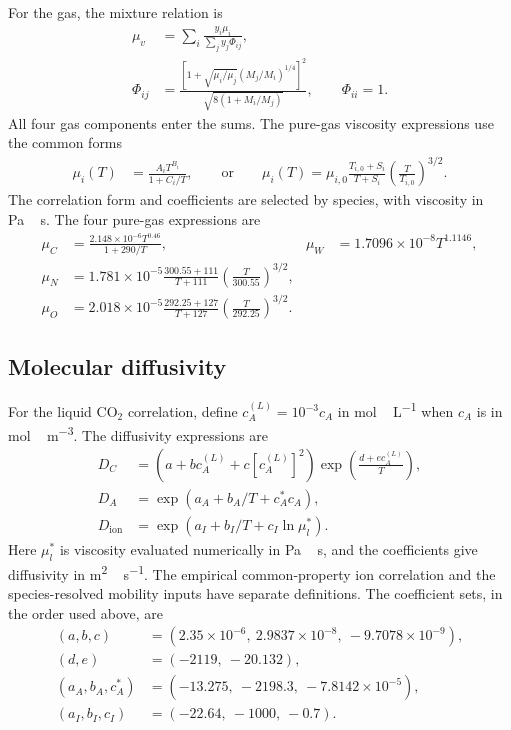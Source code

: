 For the gas, the mixture relation is
\begin{align}
\mu_v&=\sum_i\frac{y_i\mu_i}{\sum_jy_j\Phi_{ij}},\\
\Phi_{ij}&=\frac{\left[1+\sqrt{\mu_i/\mu_j}(M_j/M_i)^{1/4}\right]^2}
{\sqrt{8(1+M_i/M_j)}},\qquad \Phi_{ii}=1.
\end{align}
All four gas components enter the sums.
The pure-gas viscosity expressions use the common forms
\begin{align}
\mu_i(T)&=\frac{A_iT^{B_i}}{1+C_i/T},
\qquad\text{or}\qquad
\mu_i(T)=\mu_{i,0}\frac{T_{i,0}+S_i}{T+S_i}
\left(\frac{T}{T_{i,0}}\right)^{3/2}.
\end{align}
The correlation form and coefficients are selected by species, with viscosity in \unit{Pa\,s}.
The four pure-gas expressions are
\begin{align}
\mu_C&=\frac{2.148\times10^{-6}T^{0.46}}{1+290/T},&
\mu_W&=1.7096\times10^{-8}T^{1.1146},\\
\mu_N&=1.781\times10^{-5}\frac{300.55+111}{T+111}
\left(\frac{T}{300.55}\right)^{3/2},\\
\mu_O&=2.018\times10^{-5}\frac{292.25+127}{T+127}
\left(\frac{T}{292.25}\right)^{3/2}.
\end{align}

\subsection{Molecular diffusivity}
For the liquid CO$_2$ correlation, define $c_A^{(L)}=10^{-3}c_A$ in \unit{mol\,L^{-1}} when $c_A$ is in \unit{mol\,m^{-3}}.
The diffusivity expressions are
\begin{align}
D_C&=(a+b c_A^{(L)}+c[c_A^{(L)}]^2)
\exp\left(\frac{d+e c_A^{(L)}}{T}\right),\\
D_A&=\exp(a_A+b_A/T+c_A^*c_A),\\
D_{\mathrm{ion}}&=\exp(a_I+b_I/T+c_I\ln\mu_l^*).
\end{align}
Here $\mu_l^*$ is viscosity evaluated numerically in \unit{Pa\,s}, and the coefficients give diffusivity in \unit{m^2\,s^{-1}}.
The empirical common-property ion correlation and the species-resolved mobility inputs have separate definitions.
The coefficient sets, in the order used above, are
\begin{align}
(a,b,c)&=(2.35\times10^{-6},\ 2.9837\times10^{-8},\ -9.7078\times10^{-9}),\\
(d,e)&=(-2119,\ -20.132),\\
(a_A,b_A,c_A^*)&=(-13.275,\ -2198.3,\ -7.8142\times10^{-5}),\\
(a_I,b_I,c_I)&=(-22.64,\ -1000,\ -0.7).
\end{align}

